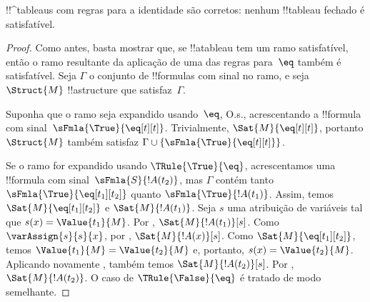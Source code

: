 \documentclass[../../../include/open-logic-section]{subfiles}
\begin{document}


\begin{prop}
!!^{tableau}s com regras para a identidade são corretos: nenhum
  !!{tableau} fechado é satisfatível.
\end{prop}

\begin{proof}
Como antes, basta mostrar que, se !!a{tableau} tem um ramo
satisfatível, então o ramo resultante da aplicação de uma das regras
para~$\eq$ também é satisfatível. Seja $\Gamma$ o conjunto de
!!{formula}s com sinal no ramo, e seja $\Struct{M}$ !!a{structure} que
satisfaz~$\Gamma$.

Suponha que o ramo seja expandido usando~$\eq$, O.s.\@, acrescentando
a !!{formula} com sinal~$\sFmla{\True}{\eq[t][t]}$. Trivialmente,
$\Sat{M}{\eq[t][t]}$, portanto $\Struct{M}$ também satisfaz $\Gamma \cup
\{\sFmla{\True}{\eq[t][t]}\}$.

Se o ramo for expandido usando $\TRule{\True}{\eq}$, acrescentamos uma
!!{formula} com sinal~$\sFmla{S}{!A(t_2)}$, mas $\Gamma$ contém tanto
$\sFmla{\True}{\eq[t_1][t_2]}$ quanto $\sFmla{\True}{!A(t_1)}$. Assim,
temos $\Sat{M}{\eq[t_1][t_2]}$ e $\Sat{M}{!A(t_1)}$. Seja $s$ uma
atribuição de variáveis tal que $s(x) = \Value{t_1}{M}$.  Por
, $\Sat{M}{!A(t_1)}[s]$. Como
$\varAssign{s}{s}{x}$, por ,
$\Sat{M}{!A(x)}[s]$. Como $\Sat{M}{\eq[t_1][t_2]}$, temos
$\Value{t_1}{M} = \Value{t_2}{M}$ e, portanto, $s(x) = \Value{t_2}{M}$.
Aplicando novamente , também temos
$\Sat{M}{!A(t_2)}[s]$.  Por ,
$\Sat{M}{!A(t_2)}$. O caso de $\TRule{\False}{\eq}$ é tratado de modo
semelhante.
\end{proof}
\end{document}
